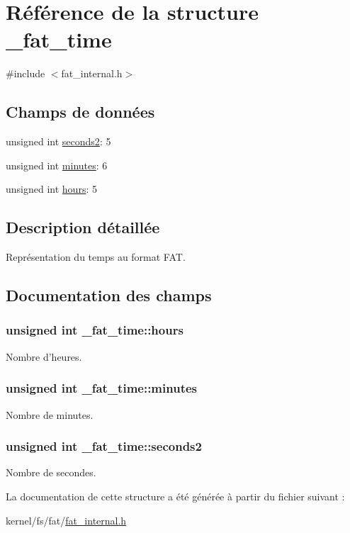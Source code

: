 \hypertarget{struct__fat__time}{\section{Référence de la structure \-\_\-fat\-\_\-time}
\label{struct__fat__time}
}


{\ttfamily \#include $<$fat\-\_\-internal.\-h$>$}

\subsection*{Champs de données}
\begin{DoxyCompactItemize}
\item 
unsigned int \hyperlink{struct__fat__time_ab02d4606058041887618d3b9beb92749}{seconds2}\-: 5
\item 
unsigned int \hyperlink{struct__fat__time_a92c31beaa1318e3ddf1457a57c30f1aa}{minutes}\-: 6
\item 
unsigned int \hyperlink{struct__fat__time_a7a3028be0bfed0b785e012d88c45f873}{hours}\-: 5
\end{DoxyCompactItemize}


\subsection{Description détaillée}
Représentation du temps au format F\-A\-T. 

\subsection{Documentation des champs}
\hypertarget{struct__fat__time_a7a3028be0bfed0b785e012d88c45f873}{
\subsubsection[{hours}]{\setlength{\rightskip}{0pt plus 5cm}unsigned int \-\_\-fat\-\_\-time\-::hours}}\label{struct__fat__time_a7a3028be0bfed0b785e012d88c45f873}
Nombre d'heures. \hypertarget{struct__fat__time_a92c31beaa1318e3ddf1457a57c30f1aa}{
\subsubsection[{minutes}]{\setlength{\rightskip}{0pt plus 5cm}unsigned int \-\_\-fat\-\_\-time\-::minutes}}\label{struct__fat__time_a92c31beaa1318e3ddf1457a57c30f1aa}
Nombre de minutes. \hypertarget{struct__fat__time_ab02d4606058041887618d3b9beb92749}{
\subsubsection[{seconds2}]{\setlength{\rightskip}{0pt plus 5cm}unsigned int \-\_\-fat\-\_\-time\-::seconds2}}\label{struct__fat__time_ab02d4606058041887618d3b9beb92749}
Nombre de secondes. 

La documentation de cette structure a été générée à partir du fichier suivant \-:\begin{DoxyCompactItemize}
\item 
kernel/fs/fat/\hyperlink{fat__internal_8h}{fat\-\_\-internal.\-h}\end{DoxyCompactItemize}
